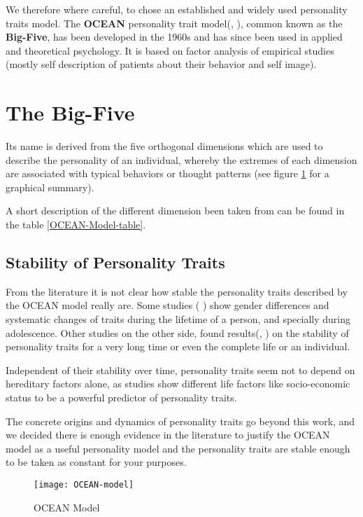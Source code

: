 We therefore where careful, to chose an established and widely used personality traits model.
The \textbf{OCEAN} personality trait model(\cite{Tupes1961}, \cite{John1999}), common known as the \textbf{Big-Five}, has been developed
in the 1960s and has since been used in applied and theoretical psychology.
It is based on factor analysis of empirical studies (mostly self description of patients about their
behavior and self image).

\section{The Big-Five}
Its name is derived from the five orthogonal dimensions which are used to describe
the personality of an individual, whereby the extremes of each dimension are associated
with typical behaviors or thought patterns (see figure \ref{OCEAN-Model} for a graphical
summary).

A short description of the different dimension been taken from\cite{Ehrler1999}
can be found in the table \ref{OCEAN-Model-table}.

\subsection{Stability of Personality Traits}
From the literature it is not clear how stable the personality traits described
by the OCEAN model really are. Some studies (\cite{Srivastava2003} \cite{Soto2011}) 
show gender differences and systematic changes of traits during the lifetime of 
a person, and specially during adolescence. Other studies on the other side, found
results(\cite{Soldz1999}, \cite{Cobb-Clark2012}) on the stability of personality traits for a very long time or even the
complete life or an individual.

\bb

Independent of their stability over time, personality traits seem not to depend on
hereditary factors alone, as studies\cite{Deckers2015} show different life factors like socio-economic status
to be a powerful predictor of personality traits.

\bb

The concrete origins and dynamics of personality traits go beyond this work, and
we decided there is enough evidence in the literature to justify the OCEAN
model as a useful personality model and the personality traits are stable enough
to be taken as constant for your purposes.

\begin{figure}[h]
    \centering
    \texttt{[image: OCEAN-model]} 
    \caption{OCEAN Model}
    \label{OCEAN-Model}
\end{figure}

